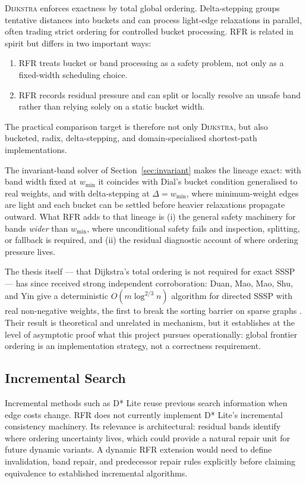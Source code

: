 \documentclass[11pt]{article}
\newcommand{\RFR}{\textsc{RFR}}
\newcommand{\Dijkstra}{\textsc{Dijkstra}}
\begin{document}
\Dijkstra{} enforces exactness by total global ordering. Delta-stepping \cite{meyer2003} groups tentative distances into buckets and can process light-edge relaxations in parallel, often trading strict ordering for controlled bucket processing. \RFR{} is related in spirit but differs in two important ways:

\begin{enumerate}
  \item \RFR{} treats bucket or band processing as a safety problem, not only as a fixed-width scheduling choice.
  \item \RFR{} records residual pressure and can split or locally resolve an unsafe band rather than relying solely on a static bucket width.
\end{enumerate}

The practical comparison target is therefore not only \Dijkstra{}, but also bucketed, radix, delta-stepping, and domain-specialised shortest-path implementations.

The invariant-band solver of Section~\ref{sec:invariant} makes the lineage exact: with band width fixed at $w_{\min}$ it coincides with Dial's bucket condition \cite{dial1969} generalised to real weights, and with delta-stepping at $\Delta=w_{\min}$, where minimum-weight edges are light and each bucket can be settled before heavier relaxations propagate outward. What \RFR{} adds to that lineage is (i) the general safety machinery for bands \emph{wider} than $w_{\min}$, where unconditional safety fails and inspection, splitting, or fallback is required, and (ii) the residual diagnostic account of where ordering pressure lives.

The thesis itself --- that Dijkstra's total ordering is not required for exact SSSP --- has since received strong independent corroboration: Duan, Mao, Mao, Shu, and Yin give a deterministic $O(m\log^{2/3} n)$ algorithm for directed SSSP with real non-negative weights, the first to break the sorting barrier on sparse graphs \cite{duan2025}. Their result is theoretical and unrelated in mechanism, but it establishes at the level of asymptotic proof what this project pursues operationally: global frontier ordering is an implementation strategy, not a correctness requirement.

\subsection{Incremental Search}

Incremental methods such as D* Lite reuse previous search information when edge costs change. \RFR{} does not currently implement D* Lite's incremental consistency machinery. Its relevance is architectural: residual bands identify where ordering uncertainty lives, which could provide a natural repair unit for future dynamic variants. A dynamic \RFR{} extension would need to define invalidation, band repair, and predecessor repair rules explicitly before claiming equivalence to established incremental algorithms.
\end{document}
